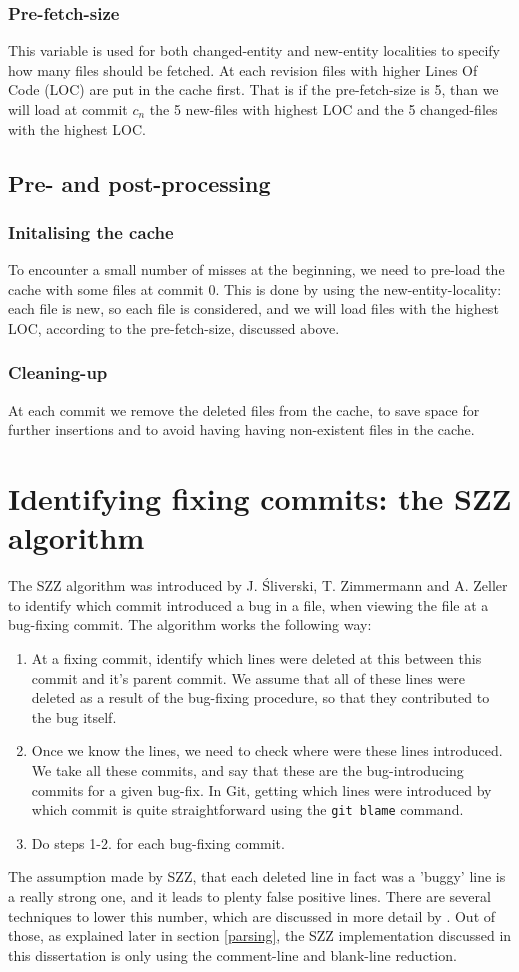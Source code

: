 \documentclass[12pt,twoside,notitlepage]{report}
\begin{document}
\subsubsection{Pre-fetch-size}
This variable is used for both changed-entity and new-entity localities to specify how many files should be fetched. At each revision files with higher Lines Of Code (LOC) are put in the cache first. That is if the pre-fetch-size is 5, than we will load at commit $c_n$ the 5 new-files with highest LOC and the 5 changed-files with the highest LOC.
\subsection{Pre- and post-processing}
\subsubsection{Initalising the cache}
To encounter a small number of misses at the beginning, we need to pre-load the cache with some files at commit $0$. This is done by using the new-entity-locality: each file is new, so each file is considered, and we will load files with the highest LOC, according to the pre-fetch-size, discussed above.
\subsubsection{Cleaning-up}
At each commit we remove the deleted files from the cache, to save space for further insertions and to avoid having having non-existent files in the cache.
\section{Identifying fixing commits: the SZZ algorithm}\label{szz}
The SZZ algorithm was introduced by J. \'Sliverski, T. Zimmermann and A. Zeller \cite{SZZ} to identify which commit introduced a bug in a file, when viewing the file at a bug-fixing commit. The algorithm works the following way:
\begin{enumerate}
\item At a fixing commit, identify which lines were deleted at this between this commit and it's parent commit. We assume that all of these lines were deleted as a result of the bug-fixing procedure, so that they contributed to the bug itself.
\item Once we know the lines, we need to check where were these lines introduced. We take all these commits, and say that these are the bug-introducing commits for a given bug-fix. In Git, getting which lines were introduced by which commit is quite straightforward using the \texttt{git blame} command.
\item Do steps 1-2. for each bug-fixing commit.
\end{enumerate}
The assumption made by SZZ, that each deleted line in fact was a 'buggy' line is a really strong one, and it leads to plenty false positive lines. There are several techniques to lower this number, which are discussed in more detail by \cite{KimZim}. Out of those, as explained later in section \ref{parsing}, the SZZ implementation discussed in this dissertation is only using the comment-line and blank-line reduction.
\end{document}
